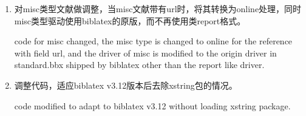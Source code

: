 \label{up:181104}
\begin{enumerate}

\item 对misc类型文献做调整，当misc文献带有url时，将其转换为online处理，同时misc类型驱动使用biblatex的原版，而不再使用类report格式。

code for misc changed, the misc type is changed to online for the reference with field url, and the driver of misc is modified to the origin driver in standard.bbx shipped by biblatex other than the report like driver.


\item 调整代码，适应biblatex v3.12版本后去除xstring包的情况。

code modified to adapt to biblatex v3.12 without loading xstring package.


\end{enumerate}


